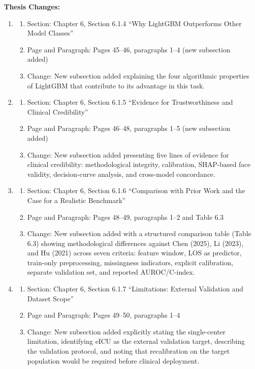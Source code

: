 \documentclass[12pt,a4paper]{article}
\begin{document}
\begin{flushleft}
\textbf{Thesis Changes:}
\begin{enumerate}
    \item
    \begin{enumerate}
        \item Section: Chapter 6, Section 6.1.4 ``Why LightGBM Outperforms Other Model Classes''
        \item Page and Paragraph: Pages 45--46, paragraphs 1--4 (new subsection added)
        \item Change: New subsection added explaining the four algorithmic properties of LightGBM that contribute to its advantage in this task.
    \end{enumerate}
    \item
    \begin{enumerate}
        \item Section: Chapter 6, Section 6.1.5 ``Evidence for Trustworthiness and Clinical Credibility''
        \item Page and Paragraph: Pages 46--48, paragraphs 1--5 (new subsection added)
        \item Change: New subsection added presenting five lines of evidence for clinical credibility: methodological integrity, calibration, SHAP-based face validity, decision-curve analysis, and cross-model concordance.
    \end{enumerate}
    \item
    \begin{enumerate}
        \item Section: Chapter 6, Section 6.1.6 ``Comparison with Prior Work and the Case for a Realistic Benchmark''
        \item Page and Paragraph: Pages 48--49, paragraphs 1--2 and Table 6.3
        \item Change: New subsection added with a structured comparison table (Table 6.3) showing methodological differences against Chen (2025), Li (2023), and Hu (2021) across seven criteria: feature window, LOS as predictor, train-only preprocessing, missingness indicators, explicit calibration, separate validation set, and reported AUROC/C-index.
    \end{enumerate}
    \item
    \begin{enumerate}
        \item Section: Chapter 6, Section 6.1.7 ``Limitations: External Validation and Dataset Scope''
        \item Page and Paragraph: Pages 49--50, paragraphs 1--4
        \item Change: New subsection added explicitly stating the single-center limitation, identifying eICU as the external validation target, describing the validation protocol, and noting that recalibration on the target population would be required before clinical deployment.
    \end{enumerate}
\end{enumerate}

\end{flushleft}
\end{document}
